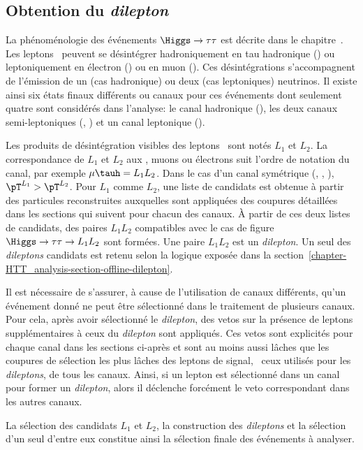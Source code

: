 \subsection{Obtention du \emph{dilepton}}\label{chapter-HTT_analysis-section-offline_selection}
La phénoménologie des événements $\Higgs\to\tau\tau$ est décrite dans le chapitre~.
Les leptons \tau\ peuvent se désintégrer hadroniquement en tau hadronique (\tauh) ou leptoniquement en électron (\ele) ou en muon (\mu).
Ces désintégrations s'accompagnent de l'émission de un (cas hadronique) ou deux (cas leptoniques) neutrinos.
Il existe ainsi six états finaux différents ou canaux pour ces événements dont seulement quatre sont considérés dans l'analyse:
le canal hadronique (\tauh\tauh),
les deux canaux semi-leptoniques (\mu\tauh, \ele\tauh)
et un canal leptonique (\ele\mu).
\par
Les produits de désintégration visibles des leptons \tau\ sont notés $L_1$ et $L_2$.
La correspondance de $L_1$ et $L_2$ aux \tauh, muons ou électrons suit l'ordre de notation du canal, par exemple $\mu\tauh=L_1L_2$.
Dans le cas d'un canal symétrique (\tauh\tauh, \mu\mu, \ele\ele), $\pT^{L_1}>\pT^{L_2}$.
Pour $L_1$ comme $L_2$, une liste de candidats est obtenue à partir des particules reconstruites auxquelles sont appliquées des coupures détaillées dans les sections qui suivent pour chacun des canaux.
À partir de ces deux listes de candidats, des paires $L_1L_2$ compatibles avec le cas de figure $\Higgs\to\tau\tau\to L_1L_2$ sont formées.
Une paire $L_1L_2$ est un \emph{dilepton}.
Un seul des \emph{dileptons} candidats est retenu selon la logique exposée dans la section~\ref{chapter-HTT_analysis-section-offline-dilepton}.
\par
Il est nécessaire de s'assurer, à cause de l'utilisation de canaux différents, qu'un événement donné ne peut être sélectionné dans le traitement de plusieurs canaux.
Pour cela, après avoir sélectionné le \emph{dilepton}, des vetos sur la présence de leptons supplémentaires à ceux du \emph{dilepton} sont appliqués.
Ces vetos sont explicités pour chaque canal dans les sections ci-après et sont au moins aussi lâches que les coupures de sélection les plus lâches des leptons de signal, \ie\ ceux utilisés pour les \emph{dileptons}, de tous les canaux.
Ainsi, si un lepton est sélectionné dans un canal pour former un \emph{dilepton}, alors il déclenche forcément le veto correspondant dans les autres canaux.
\par
La sélection des candidats $L_1$ et $L_2$, la construction des \emph{dileptons} et la sélection d'un seul d'entre eux constitue ainsi la sélection finale des événements à analyser.

